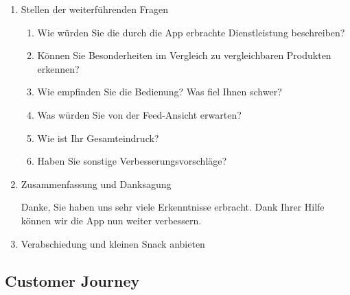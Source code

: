 \begin{enumerate}
  \item Stellen der weiterführenden Fragen

  \begin{enumerate}
    \item Wie würden Sie die durch die App erbrachte Dienstleistung beschreiben?
    \item Können Sie Besonderheiten im Vergleich zu vergleichbaren Produkten erkennen?
    \item Wie empfinden Sie die Bedienung? Was fiel Ihnen schwer?
    \item Was würden Sie von der Feed-Ansicht erwarten?
    \item Wie ist Ihr Gesamteindruck?
    \item Haben Sie sonstige Verbesserungsvorschläge?
  \end{enumerate}

  \item Zusammenfassung und Danksagung

  Danke, Sie haben uns sehr viele Erkenntnisse erbracht. Dank Ihrer Hilfe können wir die App nun weiter verbessern.

  \item Verabschiedung und kleinen Snack anbieten

\end{enumerate}

\subsection{Customer Journey}

